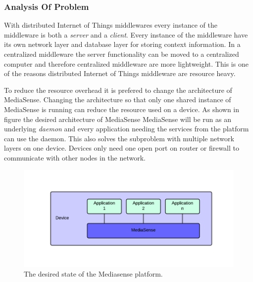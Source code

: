\subsubsection{Analysis Of Problem}
With distributed Internet of Things middlewares every instance of the middleware is both a \emph{server} and a \emph{client}. Every instance of the middleware have its own network layer and database layer for storing context information. In a centralized middleware the server functionality can be moved to a centralized computer and therefore centralized middleware are more lightweight. This is one of the reasons distributed Internet of Things middleware are resource heavy. 

To reduce the resource overhead it is prefered to change the architecture of MediaSense. Changing the architecture so that only one shared instance of MediaSense is running can reduce the resource used on a device.  As shown in figure the desired architecture of MediaSense MediaSense will be run as an underlying  \emph{daemon} and every application needing the services from the platform can use the daemon. This also solves the subproblem with multiple network layers on one device. Devices only need one open port on router or firewall to communicate with other nodes in the network. 

\begin{figure}[h!]
	\centering
    	\includegraphics[scale=0.30]{part_4/result_and_analysis/MediasenseArchNew.png}
    	\centering
		\caption{The desired state of the Mediasense platform.} 
\end{figure}
